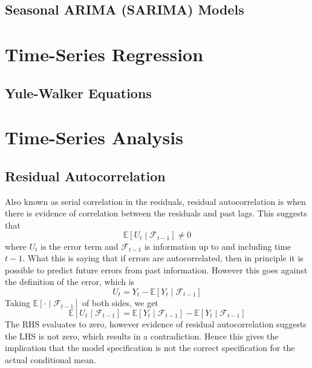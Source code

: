 \documentclass[11pt]{report} %
\begin{document}
\subsection{Seasonal ARIMA (SARIMA) Models}

\section{Time-Series Regression}

\subsection{Yule-Walker Equations}

\section{Time-Series Analysis}

\subsection{Residual Autocorrelation}

Also known as serial correlation in the residuals, residual autocorrelation is when there is evidence of correlation between the residuals and past lags. This suggests that
\begin{equation}
\mathbb{E}\left[U_{t}\middle|\mathcal{F}_{t - 1}\right] \neq 0
\end{equation}
where $U_{t}$ is the error term and $\mathcal{F}_{t - 1}$ is information up to and including time $t - 1$. What this is saying that if errors are autocorrelated, then in principle it is possible to predict future errors from past information. However this goes against the definition of the error, which is
\begin{equation}
U_{t} = Y_{t} - \mathbb{E}\left[Y_{t}\middle|\mathcal{F}_{t - 1}\right]
\end{equation}
Taking $\mathbb{E}\left[\cdot\middle|\mathcal{F}_{t - 1}\right]$ of both sides, we get
\begin{equation}
\mathbb{E}\left[U_{t}\middle|\mathcal{F}_{t - 1}\right] = \mathbb{E}\left[Y_{t}\middle|\mathcal{F}_{t - 1}\right] - \mathbb{E}\left[Y_{t}\middle|\mathcal{F}_{t - 1}\right]
\end{equation}
The RHS evaluates to zero, however evidence of residual autocorrelation suggests the LHS is not zero, which results in a contradiction. Hence this gives the implication that the model specification is not the correct specification for the actual conditional mean.
\end{document}
